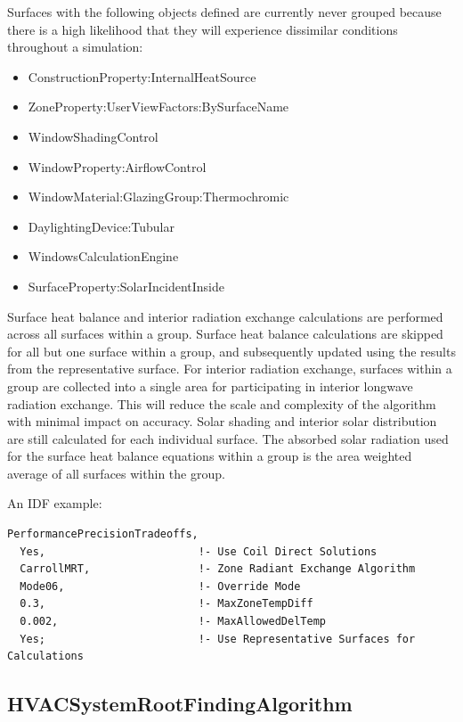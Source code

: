 Surfaces with the following objects defined are currently never grouped because there is a high likelihood that they will experience dissimilar conditions throughout a simulation:

\begin{itemize}
    \item ConstructionProperty:InternalHeatSource
    \item ZoneProperty:UserViewFactors:BySurfaceName
    \item WindowShadingControl
    \item WindowProperty:AirflowControl
    \item WindowMaterial:GlazingGroup:Thermochromic
    \item DaylightingDevice:Tubular
    \item WindowsCalculationEngine
    \item SurfaceProperty:SolarIncidentInside
\end{itemize}

Surface heat balance and interior radiation exchange calculations are performed across all surfaces within a group. Surface heat balance calculations are skipped for all but one surface within a group, and subsequently updated using the results from the representative surface. For interior radiation exchange, surfaces within a group are collected into a single area for participating in interior longwave radiation exchange. This will reduce the scale and complexity of the algorithm with minimal impact on accuracy. Solar shading and interior solar distribution are still calculated for each individual surface. The absorbed solar radiation used for the surface heat balance equations within a group is the area weighted average of all surfaces within the group.

An IDF example:

\begin{lstlisting}
PerformancePrecisionTradeoffs,
  Yes,                        !- Use Coil Direct Solutions
  CarrollMRT,                 !- Zone Radiant Exchange Algorithm
  Mode06,                     !- Override Mode
  0.3,                        !- MaxZoneTempDiff
  0.002,                      !- MaxAllowedDelTemp
  Yes;                        !- Use Representative Surfaces for Calculations
\end{lstlisting}

\subsection{HVACSystemRootFindingAlgorithm}\label{hvacystemrootfindingalgorithm}

